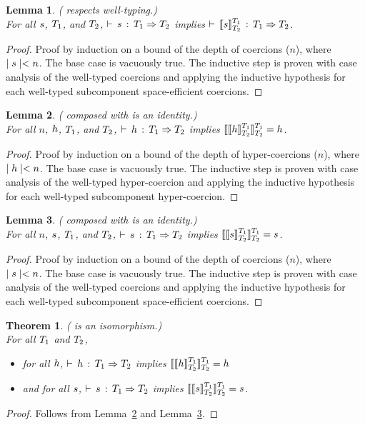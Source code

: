 \documentclass[acmtog, authorversion, acmlarge]{acmart}
\newtheorem{thm}{Theorem}
\newtheorem{lem}{Lemma}
\begin{document}
\begin{lem}
  \label{lem:inv_wt}
  ( respects well-typing.)\\
  For all $\SE$, $\T_1$, and $\T_2$,
  $\cwt{\SE}{\T_1}{\T_2}$
  implies
  $\cwt{\interp{\SE}{\T_1}{\T_2}}{\T_1}{\T_2}$.
\end{lem}
\begin{proof}
  Proof by induction on a bound of the depth of coercions ($n$),
  where $\depth{\SE} < n$. The base case is vacuously true.
  The inductive step is proven with case analysis of the well-typed
  coercions and applying the inductive hypothesis for each well-typed
  subcomponent space-efficient coercions. 
\end{proof}


\begin{lem}
  \label{lem:iso_id}
  ( composed with  is an identity.)\\
  For all $n$, $\HC$, $\T_1$, and $\T_2$,
  $\cwt{\HC}{\T_1}{\T_2}$
  implies
  $\interp{\interp{\HC}{\T_1}{\T_2}}{\T_1}{\T_2} = \HC$.
\end{lem}
\begin{proof}
  Proof by induction on a bound of the depth of hyper-coercions ($n$),
  where $\depth{\HC} < n$.
  The base case is vacuously true.
  The inductive step is proven with case analysis of the well-typed
  hyper-coercion and applying the inductive hypothesis for each well-typed
  subcomponent hyper-coercion. 
\end{proof}

\begin{lem}
  \label{lem:inv_id}
  ( composed with  is an identity.)\\
  For all $n$, $\SE$, $\T_1$, and $\T_2$,
  $\cwt{\SE}{\T_1}{\T_2}$
  implies
  $\interp{\interp{\SE}{\T_1}{\T_2}}{\T_1}{\T_2} = \SE$.
\end{lem}
\begin{proof}
  Proof by induction on a bound of the depth of coercions ($n$),
  where $\depth{\SE} < n$. The base case is vacuously true.
  The inductive step is proven with case analysis of the well-typed
  coercions and applying the inductive hypothesis for each well-typed
  subcomponent space-efficient coercions. 
\end{proof}

\begin{thm}
  \label{thm:iso}
  ( is an isomorphism.)\\
  For all $\T_1$ and $\T_2$,
  \begin{itemize}
  \item for all $\HC$,
    $\cwt{\HC}{\T_1}{\T_2}$ implies
    $\interp{\interp{h}{\T_1}{\T_2}}{\T_1}{\T_2} = \HC$
  \item and for all $\SE$, $\cwt{\SE}{\T_1}{\T_2}$ implies
      $\interp{\interp{\SE}{\T_1}{\T_2}}{\T_1}{\T_2} = \SE$.
  \end{itemize}
\end{thm}
\begin{proof}
  Follows from Lemma~\ref{lem:iso_id} and Lemma~\ref{lem:inv_id}. 
\end{proof}
\end{document}
